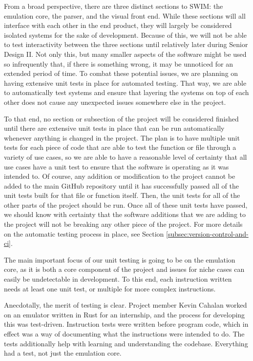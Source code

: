 \documentclass[
    paper=letter,
    parskip=half,
    fontsize=12pt,
    titlepage=firstiscover,
    toc=bibliography,
    numbers=endperiod
]{scrartcl}
\begin{document}
From a broad perspective, there are three distinct sections to SWIM: the
emulation core, the parser, and the visual front end. While these
sections will all interface with each other in the end product, they
will largely be considered isolated systems for the sake of development.
Because of this, we will not be able to test interactivity between the
three sections until relatively later during Senior Design II. Not only
this, but many smaller aspects of the software might be used so
infrequently that, if there is something wrong, it may be unnoticed for
an extended period of time. To combat these potential issues, we are
planning on having extensive unit tests in place for automated testing.
That way, we are able to automatically test systems and ensure that
layering the systems on top of each other does not cause any unexpected
issues somewhere else in the project.

To that end, no section or subsection of the project will be considered
finished until there are extensive unit tests in place that can be run
automatically whenever anything is changed in the project. The plan is
to have multiple unit tests for each piece of code that are able to test
the function or file through a variety of use cases, so we are able to
have a reasonable level of certainty that all use cases have a unit test
to ensure that the software is operating as it was intended to. Of
course, any addition or modification to the project cannot be added to
the main GitHub repository until it has successfully passed all of the
unit tests built for that file or function itself. Then, the unit tests
for all of the other parts of the project should be run. Once all of
these unit tests have passed, we should know with certainty that the
software additions that we are adding to the project will not be
breaking any other piece of the project. For more details on the
automatic testing process in place, see Section
\ref{subsec:version-control-and-ci}.

The main important focus of our unit testing is going to be on the
emulation core, as it is both a core component of the project and issues for niche cases can easily be undetectable in development. To this end, each instruction written needs at least one unit test, or multiple for more complex instructions.

Anecdotally, the merit of testing is clear. Project member Kevin Cahalan
worked on an emulator written in Rust for an internship, and the process
for developing this was test-driven. Instruction tests were written
before program code, which in effect was a way of documenting what the
instructions were intended to do. The tests additionally help with
learning and understanding the codebase. Everything had a test, not just
the emulation core.
\end{document}
